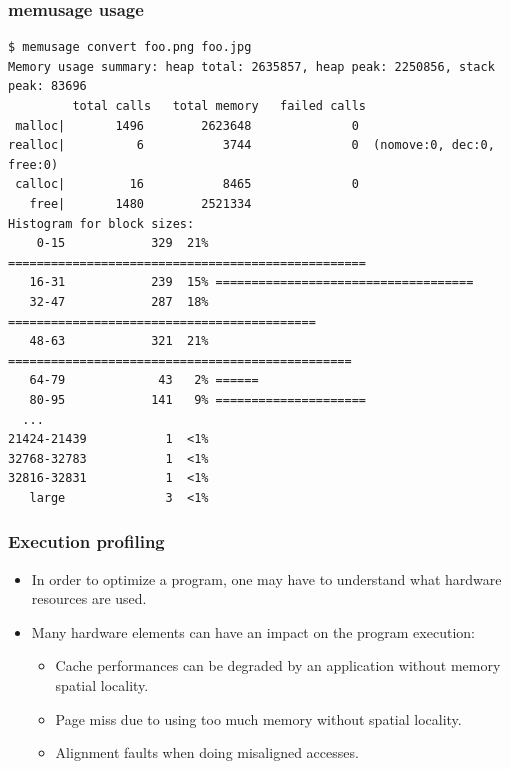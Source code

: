 \begin{frame}[fragile]
  \frametitle{memusage usage}
  \begin{block}{}
    \begin{verbatim}
$ memusage convert foo.png foo.jpg
Memory usage summary: heap total: 2635857, heap peak: 2250856, stack peak: 83696
         total calls   total memory   failed calls
 malloc|       1496        2623648              0
realloc|          6           3744              0  (nomove:0, dec:0, free:0)
 calloc|         16           8465              0
   free|       1480        2521334
Histogram for block sizes:
    0-15            329  21% ==================================================
   16-31            239  15% ====================================
   32-47            287  18% ===========================================
   48-63            321  21% ================================================
   64-79             43   2% ======
   80-95            141   9% =====================
  ...
21424-21439           1  <1% 
32768-32783           1  <1% 
32816-32831           1  <1% 
   large              3  <1% 
    \end{verbatim}
  \end{block}
\end{frame}

\begin{frame}
  \frametitle{Execution profiling}
  \begin{itemize}
    \item In order to optimize a program, one may have to understand what
          hardware resources are used.
    \item Many hardware elements can have an impact on the program execution:
    \begin{itemize}
      \item Cache performances can be degraded by an application without memory
            spatial locality.
      \item Page miss due to using too much memory without spatial locality.
      \item Alignment faults when doing misaligned accesses.
    \end{itemize}
  \end{itemize}
\end{frame}

